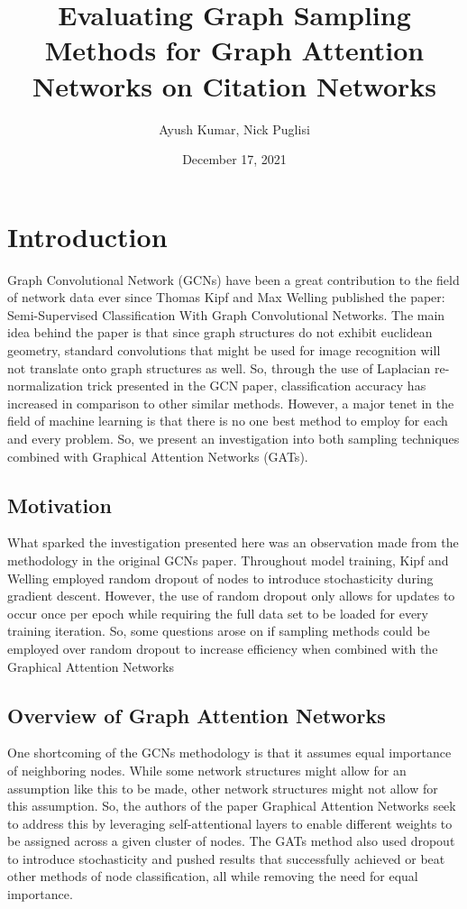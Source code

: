 \documentclass{article}
\title{Evaluating Graph Sampling Methods for Graph Attention Networks on Citation Networks}
\author{Ayush Kumar, Nick Puglisi}
\date{December 17, 2021}
\begin{document}
	\maketitle
	\tableofcontents
	\pagebreak
	\section{Introduction}
	
	Graph Convolutional Network (GCNs) have been a great contribution to the field of network data ever since Thomas Kipf and Max Welling published the paper: Semi-Supervised Classification With Graph Convolutional Networks. The main idea behind the paper is that since graph structures do not exhibit euclidean geometry, standard convolutions that might be used for image recognition will not translate onto graph structures as well. So, through the use of Laplacian re-normalization trick presented in the GCN paper, classification accuracy	has increased in comparison to other similar methods. However, a major tenet in the field of machine learning is that there is no one best method to employ for each and every problem. So, we present an investigation into both sampling techniques combined with Graphical Attention Networks (GATs).

	\subsection{Motivation}
	
	What sparked the investigation presented here was an observation made from the methodology in the original GCNs paper. 
	Throughout model training, Kipf and Welling employed random dropout of nodes to introduce stochasticity during gradient descent. However, the use of random dropout only allows
	for updates to occur once per epoch while requiring the full data set to be loaded for every training iteration. So, some questions arose on if 
	sampling methods could be employed over random dropout to increase efficiency when combined with the Graphical Attention Networks
	
	\subsection{Overview of Graph Attention Networks}
	
	One shortcoming of the GCNs methodology is that it assumes equal importance of neighboring nodes. While some network structures might allow for
	an assumption like this to be made, other network structures might not allow for this assumption. So, the authors of the paper 
	Graphical Attention Networks seek to address this by leveraging self-attentional layers to enable different weights to be assigned across a given cluster of nodes. 
	The GATs method also used dropout to introduce stochasticity and pushed results that successfully achieved or beat other methods of node classification, all while 
	removing the need for equal importance.
\end{document}
